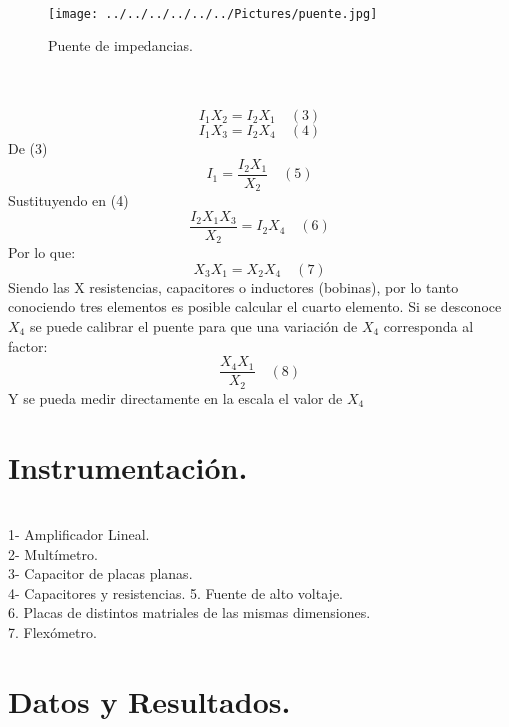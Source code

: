 \documentclass[11pt,a4paper]{article}
\begin{document}
\\
\begin{figure}[hbtp]
\centering
\texttt{[image: ../../../../../../Pictures/puente.jpg]}
\caption{Puente de impedancias.}
\end{figure}
\\
\\
\[{I}_{1} {X}_{2} = {I}_{2} {X}_{1} \quad (3)\]
\[{I}_{1} {X}_{3} = {I}_{2} {X}_{4} \quad (4)\]
De (3)
\[{I}_{1} = \frac{{I}_{2} {X}_{1} }{{X}_{2}} \quad (5) \]
Sustituyendo en (4) 
\[\frac{{I}_{2} {X}_{1} {X}_{3} }{{X}_{2}}= {I}_{2}{X}_{4} \quad (6)\]
Por lo que: 
\[{X}_{3} {X}_{1} = {X}_{2} {X}_{4} \quad (7)\]
Siendo las X resistencias, capacitores o inductores (bobinas), por lo tanto conociendo tres elementos es posible calcular el cuarto elemento. Si se desconoce $ {X}_{4}$ se puede calibrar el puente para que una variaci\'{o}n de $ {X}_{4}$ corresponda al factor:
\[\frac{{X}_{4} {X}_{1}}{{X}_{2}} \quad (8)\]
Y se pueda medir directamente en la escala el valor de  ${X}_{4}$

\section{Instrumentaci\'{o}n.}\\
1- Amplificador Lineal.\\
2- Mult\'{i}metro.\\
3- Capacitor de placas planas. \\
4- Capacitores y resistencias.
5. Fuente de alto voltaje.\\
6. Placas de distintos matriales de las mismas dimensiones.\\
7. Flex\'{o}metro.\\
\pagebreak



\section{Datos y Resultados.}\\
\end{document}
